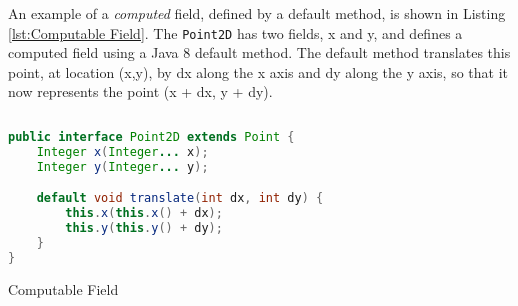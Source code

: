 An example of a \textit{computed} field, defined by a default method, is shown in Listing \ref{lst:Computable Field}.
The \texttt{Point2D} has two fields, x and y, and defines a computed field using a Java 8 default method.
The default method translates this point, at location (x,y), by dx along the x axis and dy along the y axis, so that it now represents the point (x + dx, y + dy).
\begin{sourcecode} [H]
	\begin{lstlisting}[language=Java, escapechar=|]
public interface Point2D extends Point {
	Integer x(Integer... x);
	Integer y(Integer... y);

	default void translate(int dx, int dy) {
		this.x(this.x() + dx);
		this.y(this.y() + dy);
	}
}
	\end{lstlisting}
	\caption{Computable Field}
	\label{lst:Computable Field}
\end{sourcecode}
